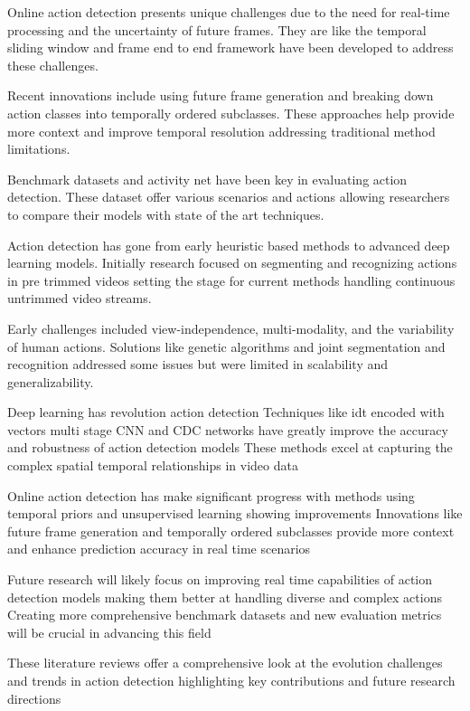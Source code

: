 {Online action detection presents unique challenges due to the need for real-time processing and the uncertainty of future frames. They are like the temporal sliding window and frame  end to end framework have been developed to address these challenges.


Recent innovations include using future frame generation and breaking down action classes into temporally ordered subclasses. These approaches help provide more context and improve temporal resolution addressing traditional method limitations.


Benchmark datasets  and activity net have been key in evaluating action detection. These dataset offer various scenarios and actions  allowing researchers to compare their models with state of the art techniques.


Action detection has gone from early heuristic based methods to advanced deep learning models. Initially research focused on segmenting and recognizing actions in pre trimmed videos setting the stage for current methods handling continuous untrimmed video streams.


Early challenges included view-independence, multi-modality, and the variability of human actions. Solutions like genetic algorithms and joint segmentation and recognition addressed some issues but were limited in scalability and generalizability.


Deep learning has revolution action detection Techniques like idt encoded with vectors multi stage CNN and CDC networks have greatly improve the accuracy and robustness of action detection models These methods excel at capturing the complex spatial temporal relationships in video data

Online action detection has make significant progress with methods using temporal priors and unsupervised learning showing improvements Innovations like future frame generation and temporally ordered subclasses provide more context and enhance prediction accuracy in real time scenarios

Future research will likely focus on improving real time capabilities of action detection models making them better at handling diverse and complex actions Creating more comprehensive benchmark datasets and new evaluation metrics will be crucial in advancing this field

These literature reviews offer a comprehensive look at the evolution challenges and trends in action detection highlighting key contributions and future research directions
   
}





